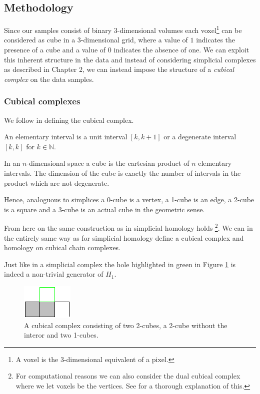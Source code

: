 \subsection{Methodology}
Since our samples consist of binary 3-dimensional volumes each voxel\footnote{A voxel is the 3-dimensional equivalent of a pixel.} can be considered as cube in a 3-dimensional grid, where a value of $1$ indicates the presence of a cube and a value of $0$ indicates the absence of one. We can exploit this inherent structure in the data and instead of considering simplicial complexes as described in Chapter 2, we can instead impose the structure of a \textit{cubical complex} on the data samples.

\subsubsection{Cubical complexes}
We follow \cite{kaczynski2004} in defining the cubical complex.
\begin{definition}
An elementary interval is a unit interval $[k,k+1]$ or a degenerate interval $[k,k]$ for $k \in \mathbb{N}$.
\end{definition}

\begin{definition}
In an $n$-dimensional space a cube is the cartesian product of $n$ elementary intervals. The dimension of the cube is exactly the number of intervals in the product which are not degenerate.
\end{definition}
Hence, analoguous to simplices a 0-cube is a vertex, a 1-cube is an edge, a 2-cube is a square and a 3-cube is an actual cube in the geometric sense.

From here on the same construction as in simplicial homology holds \footnote{For computational reasons we can also consider the dual cubical complex where we let voxels be the vertices. See \cite{dualcomplex} for a thorough explanation of this.}. We can in the entirely same way as for simplicial homology define a cubical complex and homology on cubical chain complexes.

\begin{example}
  Just like in a simplicial complex the hole highlighted in green in Figure \ref{cubecomplex} is indeed a non-trivial generator of $H_{1}$.
  \begin{figure}[htb]
    \centering
    \includegraphics[scale=2]{cubecomplex.pdf}
    \caption{\label{cubecomplex} A cubical complex consisting of two 2-cubes, a 2-cube without the interor and two 1-cubes. }
  \end{figure}
\end{example}

